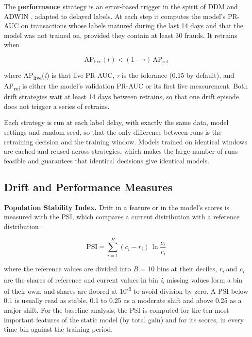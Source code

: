 The \textbf{performance} strategy is an error-based trigger in the spirit of DDM and ADWIN \cite{yelleti2025,aldaoud2025}, adapted to delayed labels. At each step it computes the model's PR-AUC on transactions whose labels matured during the last 14 days and that the model was not trained on, provided they contain at least 30 frauds. It retrains when

\begin{equation}
  \mathrm{AP}_{\mathrm{live}}(t) < (1 - \tau)\, \mathrm{AP}_{\mathrm{ref}}
  \label{eq:perftrigger}
\end{equation}

where AP\textsubscript{live}(\textit{t}) is that live PR-AUC, $\tau$ is the tolerance (0.15 by default), and AP\textsubscript{ref} is either the model's validation PR-AUC or its first live measurement. Both drift strategies wait at least 14 days between retrains, so that one drift episode does not trigger a series of retrains.

Each strategy is run at each label delay, with exactly the same data, model settings and random seed, so that the only difference between runs is the retraining decision and the training window. Models trained on identical windows are cached and reused across strategies, which makes the large number of runs feasible and guarantees that identical decisions give identical models.

\subsection{Drift and Performance Measures}\label{sec:measures}

\textbf{Population Stability Index.} Drift in a feature or in the model's scores is measured with the PSI, which compares a current distribution with a reference distribution \cite{wong2025}:

\begin{equation}
  \mathrm{PSI} = \sum_{i=1}^{B} (c_i - r_i)\,\ln\frac{c_i}{r_i}
  \label{eq:psi}
\end{equation}

where the reference values are divided into \textit{B} = 10 bins at their deciles, \textit{r\textsubscript{i}} and \textit{c\textsubscript{i}} are the shares of reference and current values in bin \textit{i}, missing values form a bin of their own, and shares are floored at 10\textsuperscript{-6} to avoid division by zero. A PSI below 0.1 is usually read as stable, 0.1 to 0.25 as a moderate shift and above 0.25 as a major shift. For the baseline analysis, the PSI is computed for the ten most important features of the static model (by total gain) and for its scores, in every time bin against the training period.

